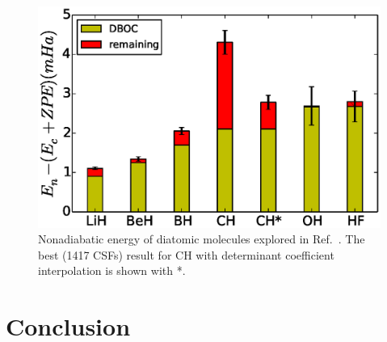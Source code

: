 \documentclass[aip,jcp,numerical,reprint]{revtex4-1}
\begin{document}
\begin{figure}[h]
\includegraphics[scale=0.5]{4738}
\caption{Nonadiabatic energy of diatomic molecules explored in Ref.~\cite{Yang2015}. The best (1417 CSFs) result for CH with determinant coefficient interpolation is shown with *. }
\end{figure}

\section{Conclusion}
\end{document}
